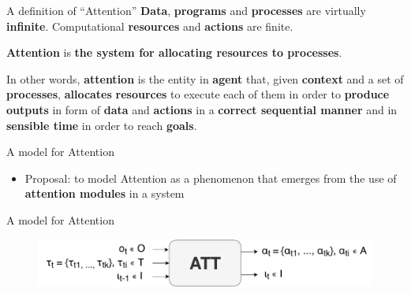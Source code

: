 \documentclass[10pt]{beamer}
\begin{document}
\begin{frame}{A definition of ``Attention''}
    \centering
    \textbf{Data}, \textbf{programs} and \textbf{processes} are virtually \textbf{infinite}.
    Computational \textbf{resources} and \textbf{actions} are finite.

    \textbf{Attention} is \textbf{the system for allocating resources to processes}.

    In other words, \textbf{attention} is the entity in \textbf{agent} that, given \textbf{context} and a set of \textbf{processes},
    \textbf{allocates} \textbf{resources} to execute each of them in order to \textbf{produce} \textbf{outputs} in form of \textbf{data} and \textbf{actions} in a \textbf{correct sequential manner} and in \textbf{sensible time} in order to reach \textbf{goals}.
\end{frame}

\begin{frame}{A model for Attention}
    \begin{itemize}
        \item Proposal: to model Attention as a phenomenon that emerges from the use of \textbf{attention modules} in a system
    \end{itemize}
\end{frame}

\begin{frame}{A model for Attention}
    \begin{figure}
        \centering
        \includegraphics[width=1.0\linewidth]{./img/alt_att_block.pdf}
    \end{figure}
\end{frame}
\end{document}
